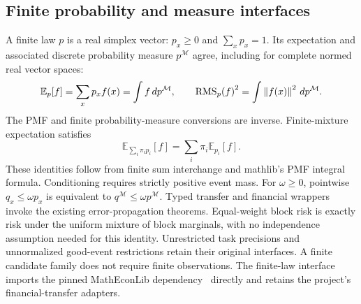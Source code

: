 \documentclass[11pt]{article}
\renewcommand{\lean}[1]{\ignorespaces}
\renewcommand{\leanok}{\ignorespaces}
\begin{document}
\subsection{Finite probability and measure
interfaces}\label{app:finite-probability}
A finite law $p$ is a real simplex vector: $p_x\ge0$ and $\sum_x p_x=1$.
Its expectation and associated discrete probability measure $p^{\mathcal M}$
agree, including for complete normed real vector spaces:
\[
  \mathbb{E}_p[f]=\sum_x p_x f(x)=\int f\,dp^{\mathcal M},\qquad
  {\operatorname{RMS}_p(f)}^2=\int\left\lVert f(x)\right\rVert^2\,dp^{\mathcal M}.
\]
\lean{FreeFoundations.FiniteProbability.integral_eq_expect,
  FreeFoundations.FiniteProbability.rms_sq_eq_integral,
FreeFoundations.FiniteProbability.eLpNorm_eq_ofReal_rms}\leanok{}
The PMF and finite probability-measure conversions are inverse. Finite-mixture
expectation satisfies
\[
  \mathbb{E}_{\sum_i\pi_i p_i}[f]=\sum_i\pi_i\mathbb{E}_{p_i}[f].
\]
\lean{FreeFoundations.FiniteProbability.toPMF_ofPMF,
  FreeFoundations.FiniteProbability.ofPMF_toPMF,
  FreeFoundations.FiniteProbability.toMeasure_ofMeasure,
  FreeFoundations.FiniteProbability.ofMeasure_toMeasure,
FreeFoundations.FiniteProbability.expect_finMixture}\leanok{}
These identities follow from finite sum interchange and mathlib's PMF integral
formula. Conditioning requires strictly positive event mass. For $\omega\ge0$,
pointwise $q_x\le\omega p_x$ is equivalent to
$q^{\mathcal M}\le\omega p^{\mathcal M}$.
\lean{FreeFoundations.FiniteProbability.expect_conditionalOn,
FreeFoundations.FiniteProbability.domination_iff}\leanok{}
Typed transfer and financial wrappers invoke the existing error-propagation
theorems. Equal-weight block risk is exactly risk under the uniform mixture of
block marginals, with no independence assumption needed for this identity.
\lean{FreeFoundations.FiniteProbability.source_target_recovery,
  FreeFoundations.FiniteProbability.marginalRisk_eq_mixture,
FreeFoundations.FiniteProbability.transfer_failure_probability}\leanok{}
Unrestricted task precisions and unnormalized good-event restrictions retain
their original interfaces. A finite candidate family does not require finite
observations. The finite-law interface imports the pinned MathEconLib
dependency~\cite{matheconlib2026} directly and retains the project's
financial-transfer adapters.
\end{document}

